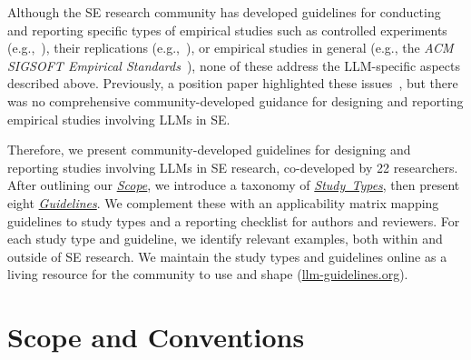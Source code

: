 \documentclass[smallextended]{svjour3}
\newcommand{\scope}{\hyperref[sec:scope]{\mbox{\emph{Scope}}}\xspace}
\newcommand{\scope}{\href{/scope/}{\emph{Scope}}\xspace}
\newcommand{\studytypes}{\hyperref[sec:study-types]{\mbox{\emph{Study Types}}}\xspace}
\newcommand{\studytypes}{\href{/study-types/}{\emph{Study Types}}\xspace}
\newcommand{\guidelines}{\hyperref[sec:guidelines]{\mbox{\emph{Guidelines}}}\xspace}
\newcommand{\guidelines}{\href{/guidelines/}{\emph{Guidelines}}\xspace}
\begin{document}
Although the SE research community has developed guidelines for conducting and reporting specific types of empirical studies such as controlled experiments (e.g.,~\cite{DBLP:books/sp/WohlinRHORW24, DBLP:books/sp/08/SSS2008}), their replications (e.g.,~\cite{DBLP:journals/tse/SantosVOJ21}), or empirical studies in general (e.g., the \emph{ACM SIGSOFT Empirical Standards}~\cite{ralph2021empiricalstandardssoftwareengineering}), none of these address the LLM-specific aspects described above.
Previously, a position paper highlighted these issues~\cite{DBLP:conf/wsese/0001BFB25}, but there was no comprehensive community-developed guidance for designing and reporting empirical studies involving LLMs in SE.

Therefore, we present community-developed guidelines for designing and reporting studies involving LLMs in SE research, co-developed by 22 researchers.
After outlining our \scope, we introduce a taxonomy of \studytypes, then present eight \guidelines.
We complement these with an applicability matrix mapping guidelines to study types and a reporting checklist for authors and reviewers.
For each study type and guideline, we identify relevant examples, both within and outside of SE research.
We maintain the study types and guidelines online as a living resource for the community to use and shape (\href{https://llm-guidelines.org/}{llm-guidelines.org}).
\space%

\section{Scope and Conventions}
\label{sec:scope}
\end{document}
